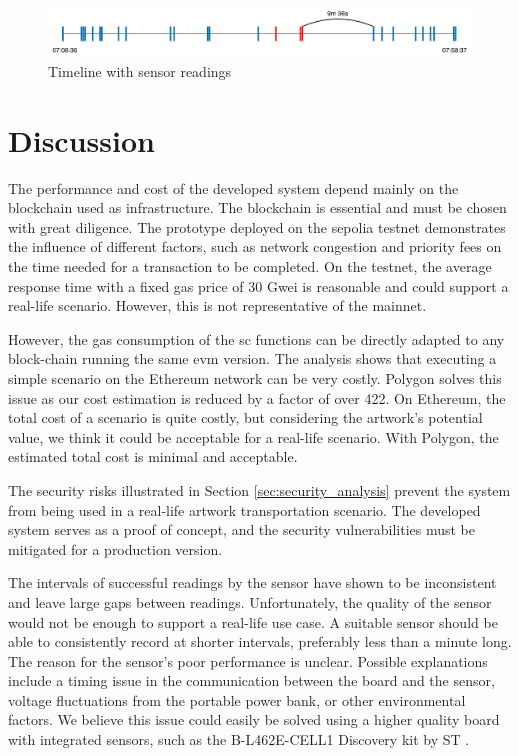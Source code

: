 \begin{figure}[ht]
    \centering
    \includegraphics[width=\textwidth]{diagrams/sensor_eval.drawio.pdf}
    \caption{Timeline with sensor readings}
    \label{fig:field_test_sensor_readings}
\end{figure}


\section{Discussion}
\label{sec:eval_discussion}
The performance and cost of the developed system depend mainly on the blockchain used as infrastructure. The blockchain is essential and must be chosen with great diligence. The prototype deployed on the sepolia testnet demonstrates the influence of different factors, such as network congestion and priority fees on the time needed for a transaction to be completed. On the testnet, the average response time with a fixed gas price of 30 Gwei is reasonable and could support a real-life scenario. However, this is not representative of the mainnet.

However, the gas consumption of the \gls{sc} functions can be directly adapted to any block-chain running the same \gls{evm} version. The analysis shows that executing a simple scenario on the Ethereum network can be very costly. Polygon solves this issue as our cost estimation is reduced by a factor of over 422. On Ethereum, the total cost of a scenario is quite costly, but considering the artwork's potential value, we think it could be acceptable for a real-life scenario. With Polygon, the estimated total cost is minimal and acceptable.

The security risks illustrated in Section \ref{sec:security_analysis} prevent the system from being used in a real-life artwork transportation scenario. The developed system serves as a proof of concept, and the security vulnerabilities must be mitigated for a production version.

The intervals of successful readings by the sensor have shown to be inconsistent and leave large gaps between readings. Unfortunately, the quality of the sensor would not be enough to support a real-life use case. A suitable sensor should be able to consistently record at shorter intervals, preferably less than a minute long. The reason for the sensor's poor performance is unclear. Possible explanations include a timing issue in the communication between the board and the sensor, voltage fluctuations from the portable power bank, or other environmental factors. We believe this issue could easily be solved using a higher quality board with integrated sensors, such as the B-L462E-CELL1 Discovery kit by ST \cite{stmdevice}. 


